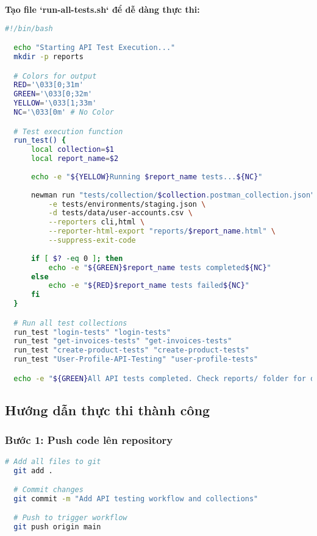 \documentclass[12pt,a4paper]{article}
\begin{document}
  \textbf{Tạo file `run-all-tests.sh` để dễ dàng thực thi:}
  \begin{lstlisting}[language=bash]
  #!/bin/bash

  echo "Starting API Test Execution..."
  mkdir -p reports

  # Colors for output
  RED='\033[0;31m'
  GREEN='\033[0;32m'
  YELLOW='\033[1;33m'
  NC='\033[0m' # No Color

  # Test execution function
  run_test() {
      local collection=$1
      local report_name=$2
      
      echo -e "${YELLOW}Running $report_name tests...${NC}"
      
      newman run "tests/collection/$collection.postman_collection.json" \
          -e tests/environments/staging.json \
          -d tests/data/user-accounts.csv \
          --reporters cli,html \
          --reporter-html-export "reports/$report_name.html" \
          --suppress-exit-code
          
      if [ $? -eq 0 ]; then
          echo -e "${GREEN}$report_name tests completed${NC}"
      else
          echo -e "${RED}$report_name tests failed${NC}"
      fi
  }

  # Run all test collections
  run_test "login-tests" "login-tests"
  run_test "get-invoices-tests" "get-invoices-tests"
  run_test "create-product-tests" "create-product-tests"
  run_test "User-Profile-API-Testing" "user-profile-tests"

  echo -e "${GREEN}All API tests completed. Check reports/ folder for detailed results.${NC}"
  \end{lstlisting}

  \subsection{Hướng dẫn thực thi thành công}

  \subsubsection{Bước 1: Push code lên repository}

  \begin{lstlisting}[language=bash]
  # Add all files to git
  git add .

  # Commit changes
  git commit -m "Add API testing workflow and collections"

  # Push to trigger workflow
  git push origin main
  \end{lstlisting}
\end{document}
